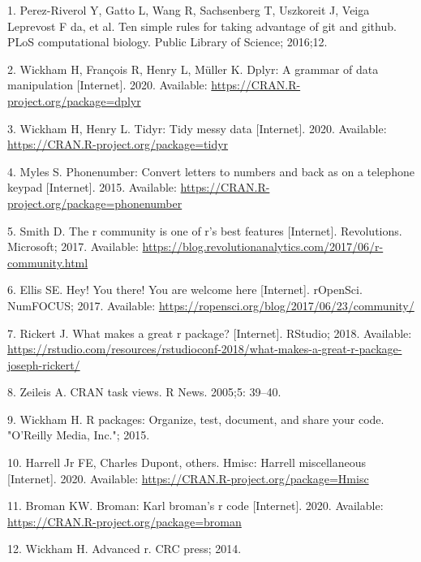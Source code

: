 \documentclass[10pt,letterpaper]{article}
\begin{document}
\hypertarget{refs}{}
\leavevmode\hypertarget{ref-perez2016}{}%
1. Perez-Riverol Y, Gatto L, Wang R, Sachsenberg T, Uszkoreit J, Veiga
Leprevost F da, et al. Ten simple rules for taking advantage of git and
github. PLoS computational biology. Public Library of Science; 2016;12.

\leavevmode\hypertarget{ref-dplyr}{}%
2. Wickham H, François R, Henry L, Müller K. Dplyr: A grammar of data
manipulation {[}Internet{]}. 2020. Available:
\url{https://CRAN.R-project.org/package=dplyr}

\leavevmode\hypertarget{ref-tidyr}{}%
3. Wickham H, Henry L. Tidyr: Tidy messy data {[}Internet{]}. 2020.
Available: \url{https://CRAN.R-project.org/package=tidyr}

\leavevmode\hypertarget{ref-phonenumber}{}%
4. Myles S. Phonenumber: Convert letters to numbers and back as on a
telephone keypad {[}Internet{]}. 2015. Available:
\url{https://CRAN.R-project.org/package=phonenumber}

\leavevmode\hypertarget{ref-smith2017}{}%
5. Smith D. The r community is one of r's best features {[}Internet{]}.
Revolutions. Microsoft; 2017. Available:
\url{https://blog.revolutionanalytics.com/2017/06/r-community.html}

\leavevmode\hypertarget{ref-ellis2017}{}%
6. Ellis SE. Hey! You there! You are welcome here {[}Internet{]}.
rOpenSci. NumFOCUS; 2017. Available:
\url{https://ropensci.org/blog/2017/06/23/community/}

\leavevmode\hypertarget{ref-rickert2018}{}%
7. Rickert J. What makes a great r package? {[}Internet{]}. RStudio;
2018. Available:
\url{https://rstudio.com/resources/rstudioconf-2018/what-makes-a-great-r-package-joseph-rickert/}

\leavevmode\hypertarget{ref-zeileis2005}{}%
8. Zeileis A. CRAN task views. R News. 2005;5: 39--40.

\leavevmode\hypertarget{ref-wickham2015}{}%
9. Wickham H. R packages: Organize, test, document, and share your code.
"O'Reilly Media, Inc."; 2015.

\leavevmode\hypertarget{ref-Hmisc}{}%
10. Harrell Jr FE, Charles Dupont, others. Hmisc: Harrell miscellaneous
{[}Internet{]}. 2020. Available:
\url{https://CRAN.R-project.org/package=Hmisc}

\leavevmode\hypertarget{ref-broman}{}%
11. Broman KW. Broman: Karl broman's r code {[}Internet{]}. 2020.
Available: \url{https://CRAN.R-project.org/package=broman}

\leavevmode\hypertarget{ref-wickham2014}{}%
12. Wickham H. Advanced r. CRC press; 2014.
\end{document}
